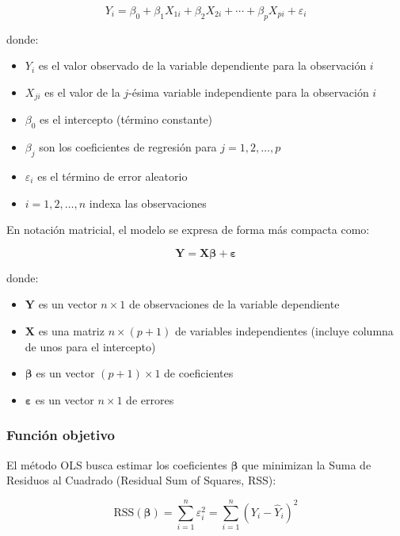 \documentclass[
  doc,
  floatsintext,
  longtable,
  a4paper,
  nolmodern,
  notxfonts,
  notimes,
  12pt,
  colorlinks=true,linkcolor=blue,citecolor=blue,urlcolor=blue]{apa7}
\providecommand{\tightlist}{%
  \setlength{\itemsep}{0pt}\setlength{\parskip}{0pt}}
\begin{document}
\[
Y_i = \beta_0 + \beta_1 X_{1i} + \beta_2 X_{2i} + \cdots + \beta_p X_{pi} + \varepsilon_i
\]

donde:

\begin{itemize}
\tightlist
\item
  \(Y_i\) es el valor observado de la variable dependiente para la
  observación \(i\)
\item
  \(X_{ji}\) es el valor de la \(j\)-ésima variable independiente para
  la observación \(i\)
\item
  \(\beta_0\) es el intercepto (término constante)
\item
  \(\beta_j\) son los coeficientes de regresión para
  \(j = 1, 2, \ldots, p\)
\item
  \(\varepsilon_i\) es el término de error aleatorio
\item
  \(i = 1, 2, \ldots, n\) indexa las observaciones
\end{itemize}

En notación matricial, el modelo se expresa de forma más compacta como:

\[
\mathbf{Y} = \mathbf{X}\boldsymbol{\beta} + \boldsymbol{\varepsilon}
\]

donde:

\begin{itemize}
\tightlist
\item
  \(\mathbf{Y}\) es un vector \(n \times 1\) de observaciones de la
  variable dependiente
\item
  \(\mathbf{X}\) es una matriz \(n \times (p+1)\) de variables
  independientes (incluye columna de unos para el intercepto)
\item
  \(\boldsymbol{\beta}\) es un vector \((p+1) \times 1\) de coeficientes
\item
  \(\boldsymbol{\varepsilon}\) es un vector \(n \times 1\) de errores
\end{itemize}

\subsubsection{Función objetivo}\label{funciuxf3n-objetivo}

El método OLS busca estimar los coeficientes \(\boldsymbol{\beta}\) que
minimizan la Suma de Residuos al Cuadrado (Residual Sum of Squares,
RSS):

\[
\text{RSS}(\boldsymbol{\beta}) = \sum_{i=1}^{n} \varepsilon_i^2 = \sum_{i=1}^{n} (Y_i - \hat{Y}_i)^2
\]
\end{document}
